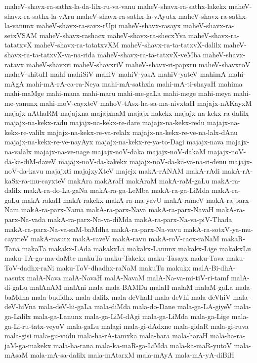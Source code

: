 {maheV-shavx-ra-sathx-la-da-lilx-ru-va-vanu
maheV-shavx-ra-sathx-lakekx
maheV-shavx-ra-sathx-la-vAru
maheV-shavx-ra-sathx-la-vAyutx
maheV-shavx-ra-sathx-la-vanunx
maheV-shavx-ra-savx-rUpi
maheV-shavx-rasayx
maheV-shavx-ra-setxVSAM
maheV-shavx-rashacx
maheV-shavx-ra-shecxYva
maheV-shavx-ra-tatatxvX
maheV-shavx-ra-tatatxvXM
maheV-shavx-ra-ta-tatxvX-dalilx
maheV-shavx-ra-ta-tatxvX-va-na-rida
maheV-shavx-ra-ta-tatxvX-veMba
maheV-shavx-ratavx
maheV-shavxri
maheV-shavxriV
maheV-shavx-ri-papxru
maheV-shavxroV
maheV-shituH
mahf
mahiSiV
mahiV
mahiV-yasA
mahiV-yateV
mahimA
mahi-mAgA
mahi-mA-rA-ca-ra-Neya
mahi-mA-sathxla
mahi-mA-ti-shayaH
mahima
mahi-maMge
mahi-mana
mahi-maru
mahi-me-gaLa
mahi-mege
mahi-meya
mahi-me-yanunx
mahi-moV-cayxteV
mahoV-tAsx-ha-sa-ma-nivxtaH
majajx-nAKayxM
majajx-nAthaRM
majajxna
majajxnaM
majajx-nakekx
majajx-na-kekx-ra-dalilx
majajx-na-kekx-radu
majajx-na-kekx-re-dare
majajx-na-kekx-redu
majajx-na-kekx-re-valilx
majajx-na-kekx-re-va-relalx
majajx-na-kekx-re-ve-na-lalx-dAnu
majajx-na-kekx-re-ve-nayAyx
majajx-na-kekx-re-ya-to-Dagi
majajx-nava
majajx-na-valalx
majajx-na-ve-nage
majajx-noV-daka
majajx-noV-dakaM
majajx-noV-da-ka-diM-daveV
majajx-noV-da-kakekx
majajx-noV-da-ka-va-na-ri-denu
majajx-noV-da-kavu
majajxti
majajxyXteV
majejx
makA-rANAM
makA-rAdi
makA-rA-kaSx-ra-mu-cayxteV
makAra
makAraH
makAraM
makA-raM-gaLu
makA-ra-dalilx
makA-ra-do-La-gaNa
makA-ra-ga-LeMba
makA-ra-ga-LiMda
makA-ra-gaLu
makA-rakaH
makA-rakekx
makA-ra-ma-yavU
makA-rameV
makA-ra-parx-Nam
makA-ra-parx-Nama
makA-ra-parx-Nava
makA-ra-parx-NavaH
makA-ra-parx-Na-vada
makA-ra-parx-Na-va-diMda
makA-ra-parx-Na-va-piV-Thada
makA-ra-parx-Na-va-saM-baMdha
makA-ra-parx-Na-vavu
makA-ra-sotxV-ya-mu-cayxteV
makA-rasutx
makA-raveV
makA-ravu
makA-roV-cacx-raNaM
makaR-Tana
makaTa
makakx-LAda
makakxLa
makakx-Lanunx
makakx-Lige
makakxLu
maku-TA-ga-ma-daMte
makuTa
maku-Takekx
maku-Tasayx
maku-Tava
maku-ToV-dadhx-raNi
maku-ToV-dhadhx-raNaM
makuTu
makukx
malA-Bi-dhA-nasutx
malA-Nava
malA-NavaH
malA-NavaM
malA-Na-va-mi-tiV-ri-tamf
malA-di-gaLu
malAnAM
malAni
mala
mala-BAMDa
malaH
malaM
malaM-gaLa
mala-baMdha
mala-budidhx
mala-dalilx
mala-deVhaH
mala-deVhi
mala-deVhiV
mala-deV-hiVna
mala-deV-hi-gaLa
mala-diMda
mala-do-Dane
mala-ga-LA-giyeV
mala-ga-Lalilx
mala-ga-Lanunx
mala-ga-LiM-dAgi
mala-ga-LiMda
mala-ga-Lige
mala-ga-Li-ru-tatx-veyoV
mala-gaLu
malagi
mala-gi-dAdxne
mala-gidaR
mala-gi-ruva
mala-gisi
mala-gu-vudu
mala-ha-rA-tamxka
mala-hara
mala-haraH
mala-ha-ra-jaM-ga-makekx
mala-ha-rana
mala-ka-maR-ga-LiMda
mala-ka-maR-yutoV
mala-mAsaM
mala-mA-sa-dalilx
mala-mAtarxM
mala-mAyA
mala-mA-yA-diBiH
}
